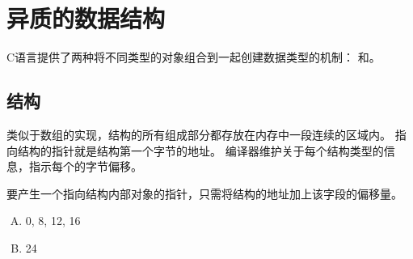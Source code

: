 
\section{异质的数据结构}
{
    C语言提供了两种将不同类型的对象组合到一起创建数据类型的机制：
    和。

    \subsection{结构}
    {
        类似于数组的实现，结构的所有组成部分都存放在内存中一段连续的区域内。
        指向结构的指针就是结构第一个字节的地址。
        编译器维护关于每个结构类型的信息，指示每个的字节偏移。

        要产生一个指向结构内部对象的指针，只需将结构的地址加上该字段的偏移量。

        \begin{practicec}
            \begin{enumerate}[A.]
                \item 0, 8, 12, 16
                \item 24
            \end{enumerate}
        \end{practicec}
    }
}
